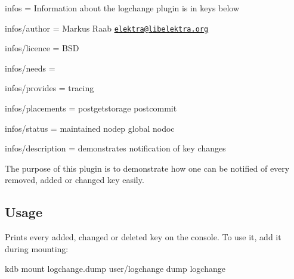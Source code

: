 
\begin{DoxyItemize}
\item infos = Information about the logchange plugin is in keys below
\item infos/author = Markus Raab \href{mailto:elektra@libelektra.org}{\tt elektra@libelektra.\+org}
\item infos/licence = B\+SD
\item infos/needs =
\item infos/provides = tracing
\item infos/placements = postgetstorage postcommit
\item infos/status = maintained nodep global nodoc
\item infos/description = demonstrates notification of key changes
\end{DoxyItemize}

The purpose of this plugin is to demonstrate how one can be notified of every removed, added or changed key easily.

\subsection*{Usage}

Prints every added, changed or deleted key on the console. To use it, add it during mounting\+: \begin{DoxyVerb}kdb mount logchange.dump user/logchange dump logchange\end{DoxyVerb}
 